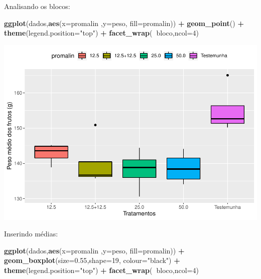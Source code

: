 \documentclass[
]{book}
\newenvironment{Shaded}{\begin{snugshade}}{\end{snugshade}}
\newcommand{\DataTypeTok}[1]{\textcolor[rgb]{0.13,0.29,0.53}{#1}}
\newcommand{\DecValTok}[1]{\textcolor[rgb]{0.00,0.00,0.81}{#1}}
\newcommand{\FloatTok}[1]{\textcolor[rgb]{0.00,0.00,0.81}{#1}}
\newcommand{\KeywordTok}[1]{\textcolor[rgb]{0.13,0.29,0.53}{\textbf{#1}}}
\newcommand{\NormalTok}[1]{#1}
\newcommand{\OperatorTok}[1]{\textcolor[rgb]{0.81,0.36,0.00}{\textbf{#1}}}
\newcommand{\StringTok}[1]{\textcolor[rgb]{0.31,0.60,0.02}{#1}}
\begin{document}
Analisando os blocos:

\begin{Shaded}
\begin{Highlighting}[]
\KeywordTok{ggplot}\NormalTok{(dados,}\KeywordTok{aes}\NormalTok{(}\DataTypeTok{x=}\NormalTok{promalin ,}\DataTypeTok{y=}\NormalTok{peso, }\DataTypeTok{fill=}\NormalTok{promalin)) }\OperatorTok{+}\StringTok{ }
\StringTok{       }\KeywordTok{geom_point}\NormalTok{() }\OperatorTok{+}\StringTok{ }
\StringTok{       }\KeywordTok{theme}\NormalTok{(}\DataTypeTok{legend.position=}\StringTok{"top"}\NormalTok{) }\OperatorTok{+}\StringTok{ }
\StringTok{       }\KeywordTok{facet_wrap}\NormalTok{(}\OperatorTok{~}\NormalTok{bloco,}\DataTypeTok{ncol=}\DecValTok{4}\NormalTok{)}
\end{Highlighting}
\end{Shaded}

\includegraphics{TudodoR_files/figure-latex/unnamed-chunk-235-1.pdf}

Inserindo médias:

\begin{Shaded}
\begin{Highlighting}[]
\KeywordTok{ggplot}\NormalTok{(dados,}\KeywordTok{aes}\NormalTok{(}\DataTypeTok{x=}\NormalTok{promalin ,}\DataTypeTok{y=}\NormalTok{peso, }\DataTypeTok{fill=}\NormalTok{promalin)) }\OperatorTok{+}\StringTok{ }
\StringTok{  }\KeywordTok{geom_boxplot}\NormalTok{(}\DataTypeTok{size=}\FloatTok{0.55}\NormalTok{,}\DataTypeTok{shape=}\DecValTok{19}\NormalTok{, }\DataTypeTok{colour=}\StringTok{"black"}\NormalTok{) }\OperatorTok{+}\StringTok{ }
\StringTok{  }\KeywordTok{theme}\NormalTok{(}\DataTypeTok{legend.position=}\StringTok{"top"}\NormalTok{) }\OperatorTok{+}\StringTok{ }
\StringTok{  }\KeywordTok{facet_wrap}\NormalTok{(}\OperatorTok{~}\NormalTok{bloco,}\DataTypeTok{ncol=}\DecValTok{4}\NormalTok{) }
\end{Highlighting}
\end{Shaded}
\end{document}
